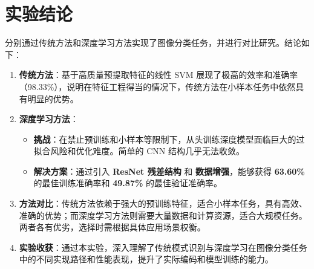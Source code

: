\documentclass[UTF8]{ctexart}
\begin{document}
\section{实验结论}
分别通过传统方法和深度学习方法实现了图像分类任务，并进行对比研究。结论如下：
\begin{enumerate}
    \item \textbf{传统方法}：基于高质量预提取特征的线性 SVM 展现了极高的效率和准确率（98.33\%），说明在特征工程得当的情况下，传统方法在小样本任务中依然具有明显的优势。
    \item \textbf{深度学习方法}：
    \begin{itemize}
        \item \textbf{挑战}：在禁止预训练和小样本等限制下，从头训练深度模型面临巨大的过拟合风险和优化难度。简单的 CNN 结构几乎无法收敛。
        \item \textbf{解决方案}：通过引入 \textbf{ResNet 残差结构} 和 \textbf{数据增强}，能够获得 \textbf{63.60\%} 的最佳训练准确率和 \textbf{49.87\%} 的最佳验证准确率。
    \end{itemize}
    \item \textbf{方法对比}：传统方法依赖于强大的预训练特征，适合小样本任务，具有高效、准确的优势；而深度学习方法则需要大量数据和计算资源，适合大规模任务。两者各有优劣，选择时需根据具体应用场景权衡。
    \item \textbf{实验收获}：通过本实验，深入理解了传统模式识别与深度学习在图像分类任务中的不同实现路径和性能表现，提升了实际编码和模型训练的能力。
\end{enumerate}
\end{document}
